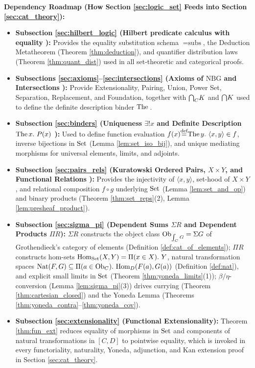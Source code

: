 \documentclass[10pt,a4paper]{article}
\begin{document}
\noindent\textbf{Dependency Roadmap (How Section \ref{sec:logic_set} Feeds into Section \ref{sec:cat_theory}):}
\begin{itemize}
\item \textbf{Subsection \ref{sec:hilbert_logic} (Hilbert predicate calculus with equality \cite{HilbertAckermann1928,Kleene1952,Mendelson2015}):} Provides the equality substitution schema $=\textrm{subs}$, the Deduction Metatheorem (Theorem \ref{thm:deduction}), and quantifier distribution laws (Theorem \ref{thm:quant_dist}) used in all set-theoretic and categorical proofs.
\item \textbf{Subsections \ref{sec:axioms}--\ref{sec:intersections} (Axioms of $\mathrm{NBG}$ and Intersections \cite{Godel1940,Bernays1958,TakeutiZaring1982}):} Provide Extensionality, Pairing, Union, Power Set, Separation, Replacement, and Foundation, together with ${{\bigcap}_C} K$ and ${\bigcap} K$ used to define the definite description binder ${\textrm{The\,}}$.
\item \textbf{Subsection \ref{sec:binders} (Uniqueness $\exists!x$ and Definite Description $\The x.\ P(x)$ \cite{Russell1905}):} Used to define function evaluation $f(x) {\stackrel{{\textrm{def}}}{=}} {\textrm{The\,}} y.\ \langle x, y \rangle \in f$, inverse bijections in ${\textrm{Set}}$ (Lemma \ref{lem:set_iso_bij}), and unique mediating morphisms for universal elements, limits, and adjoints.
\item \textbf{Subsection \ref{sec:pairs_rels} (Kuratowski Ordered Pairs, $X \times Y$, and Functional Relations \cite{Kuratowski1921}):} Provides the injectivity of $\langle x, y \rangle$, set-hood of $X \times Y$, and relational composition $f \circ g$ underlying ${\textrm{Set}}$ (Lemma \ref{lem:set_and_op}) and binary products (Theorem \ref{thm:set_reps}(2), Lemma \ref{lem:presheaf_product}).
\item \textbf{Subsection \ref{sec:sigma_pi} (Dependent Sums $\Sigma R$ and Dependent Products $\Pi R$):} $\Sigma R$ constructs the object class ${\textrm{Ob}}_{\int_C G} = \Sigma G$ of Grothendieck's category of elements \cite{Grothendieck1960,SGA4} (Definition \ref{def:cat_of_elements}); $\Pi R$ constructs hom-sets ${\textrm{Hom}}_{\textrm{Set}}(X, Y) = \Pi(x \in X).\ Y$, natural transformation spaces $\Nat(F, G) \subseteq \Pi(a \in \Ob_C).\ \Hom_D(F(a), G(a))$ (Definition \ref{def:nat}), and explicit small limits in ${\textrm{Set}}$ (Theorem \ref{thm:yoneda_limits}(1)); $\beta/\eta$-conversion (Lemma \ref{lem:sigma_pi}(3)) drives currying (Theorem \ref{thm:cartesian_closed}) and the Yoneda Lemma \cite{Yoneda1954} (Theorems \ref{thm:yoneda_contra}--\ref{thm:yoneda_cov}).
\item \textbf{Subsection \ref{sec:extensionality} (Functional Extensionality):} Theorem \ref{thm:fun_ext} reduces equality of morphisms in ${\textrm{Set}}$ and components of natural transformations in $[C, D]$ to pointwise equality, which is invoked in every functoriality, naturality, Yoneda, adjunction, and Kan extension \cite{Kan1958} proof in Section \ref{sec:cat_theory}.

\end{itemize}
\end{document}
